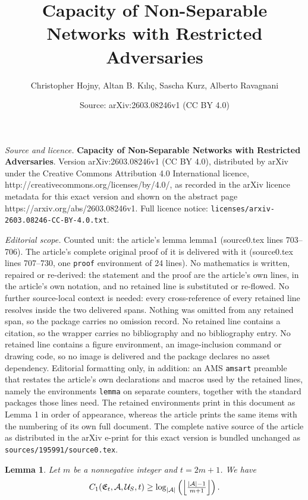 \documentclass[10pt,a4paper]{amsart}
\title{\textbf{Capacity of Non-Separable Networks with Restricted Adversaries}}
\author{Christopher Hojny, Altan B. K\i l\i\c{c}, Sascha Kurz, Alberto Ravagnani}
\date{Source: arXiv:2603.08246v1 (CC BY 4.0)}
\newtheorem{lemma}{Lemma}
\newcommand{\CC}{\textnormal{C}}
\newcommand{\mA}{\mathcal{A}}
\newcommand{\mU}{\mathcal{U}}
\begin{document}
\maketitle

\noindent\emph{Source and licence.} \textbf{Capacity of Non-Separable Networks with Restricted Adversaries}. Version arXiv:2603.08246v1 (CC BY 4.0), distributed by arXiv under the Creative Commons Attribution 4.0 International licence, http://creativecommons.org/licenses/by/4.0/, as recorded in the arXiv licence metadata for this exact version and shown on the abstract page https://arxiv.org/abs/2603.08246v1. Full licence notice: \texttt{licenses/arxiv-2603.08246-CC-BY-4.0.txt}.\par\smallskip

\noindent\textit{Editorial scope.} Counted unit: the article's lemma lemma1 (source0.tex lines 703--706). The article's complete original proof of it is delivered with it (source0.tex lines 707--730, one \texttt{proof} environment of 24 lines). No mathematics is written, repaired or re-derived: the statement and the proof are the article's own lines, in the article's own notation, and no retained line is substituted or re-flowed.  No further source-local context is needed: every cross-reference of every retained line resolves inside the two delivered spans.  Nothing was omitted from any retained span, so the package carries no omission record.  No retained line contains a citation, so the wrapper carries no bibliography and no bibliography entry.  No retained line contains a figure environment, an image-inclusion command or drawing code, so no image is delivered and the package declares no asset dependency.  Editorial formatting only, in addition: an AMS \texttt{amsart} preamble that restates the article's own declarations and macros used by the retained lines, namely the environments \texttt{lemma} on separate counters, together with the standard packages those lines need.  The retained environments print in this document as Lemma 1 in order of appearance, whereas the article prints the same items with the numbering of its own full document.  The complete native source of the article as distributed in the arXiv e-print for this exact version is bundled unchanged as \texttt{sources/195991/source0.tex}.
\begin{lemma}
\label{lemma1}
Let $m$ be a nonnegative integer and $t=2m+1$. We have $$\CC_1(\mathfrak{E}_t,\mA,\mU_S,t) \ge \log_{|\mA|}\left(\left\lfloor\tfrac{|\mathcal{A}|-1}{m+1}\right\rfloor\right).$$
\end{lemma}
\end{document}
